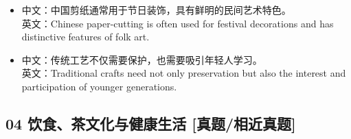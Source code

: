 \documentclass[a4paper,11pt,UTF8,fontset=none]{ctexart}
\begin{document}
\endgroup
\vspace{-2pt}

\par

\begin{itemize}[leftmargin=1.7em,itemsep=1pt,parsep=0pt,topsep=2pt]
\item \noindent 中文：中国剪纸通常用于节日装饰，具有鲜明的民间艺术特色。\\ 英文：Chinese paper-cutting is often used for festival decorations and has distinctive features of folk art.\par


\item \noindent 中文：传统工艺不仅需要保护，也需要吸引年轻人学习。\\ 英文：Traditional crafts need not only preservation but also the interest and participation of younger generations.\par


\end{itemize}

\subsection{04 饮食、茶文化与健康生活 {\color{AccentBlue} [真题/相近真题]}}
\end{document}
